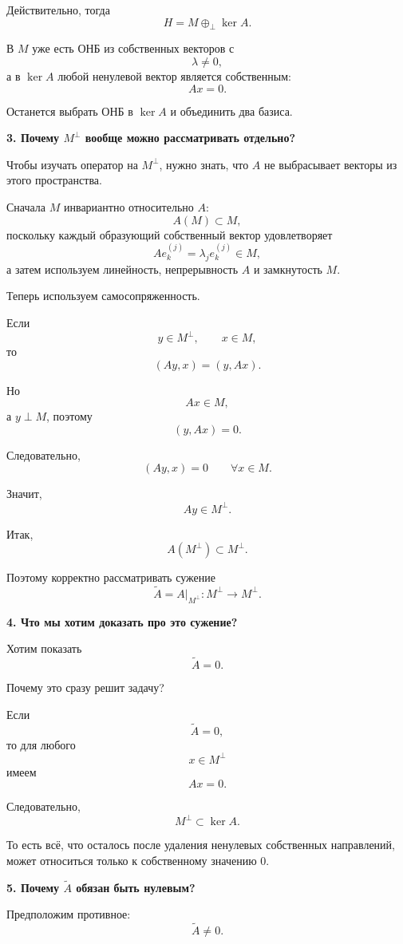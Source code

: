 \begin{idea}
	Действительно, тогда
	\[
	H=M\oplus_\perp\ker A.
	\]
	
	В \(M\) уже есть ОНБ из собственных векторов с
	\[
	\lambda\neq0,
	\]
	а в \(\ker A\) любой ненулевой вектор является собственным:
	\[
	Ax=0.
	\]
	
	Останется выбрать ОНБ в \(\ker A\) и объединить два базиса.
	
	\medskip
	
	\textbf{3. Почему \(M^\perp\) вообще можно рассматривать отдельно?}
	
	Чтобы изучать оператор на \(M^\perp\), нужно знать, что \(A\)
	не выбрасывает векторы из этого пространства.
	
	Сначала \(M\) инвариантно относительно \(A\):
	\[
	A(M)\subset M,
	\]
	поскольку каждый образующий собственный вектор удовлетворяет
	\[
	Ae_k^{(j)}
	=
	\lambda_j e_k^{(j)}\in M,
	\]
	а затем используем линейность, непрерывность \(A\) и замкнутость \(M\).
	
	Теперь используем самосопряженность.
	
	Если
	\[
	y\in M^\perp,
	\qquad
	x\in M,
	\]
	то
	\[
	(Ay,x)
	=
	(y,Ax).
	\]
	
	Но
	\[
	Ax\in M,
	\]
	а \(y\perp M\), поэтому
	\[
	(y,Ax)=0.
	\]
	
	Следовательно,
	\[
	(Ay,x)=0
	\qquad
	\forall x\in M.
	\]
	
	Значит,
	\[
	Ay\in M^\perp.
	\]
	
	Итак,
	\[
	\boxed{
		A(M^\perp)\subset M^\perp.
	}
	\]
	
	Поэтому корректно рассматривать сужение
	\[
	\widetilde A
	=
	A|_{M^\perp}
	:
	M^\perp\to M^\perp.
	\]
	
	\medskip
	
	\textbf{4. Что мы хотим доказать про это сужение?}
	
	Хотим показать
	\[
	\boxed{\widetilde A=0.}
	\]
	
	Почему это сразу решит задачу?
	
	Если
	\[
	\widetilde A=0,
	\]
	то для любого
	\[
	x\in M^\perp
	\]
	имеем
	\[
	Ax=0.
	\]
	
	Следовательно,
	\[
	M^\perp\subset\ker A.
	\]
	
	То есть всё, что осталось после удаления ненулевых собственных направлений,
	может относиться только к собственному значению \(0\).
	
	\medskip
	
	\textbf{5. Почему \(\widetilde A\) обязан быть нулевым?}
	
	Предположим противное:
	\[
	\widetilde A\neq0.
	\]
	

\end{idea}
